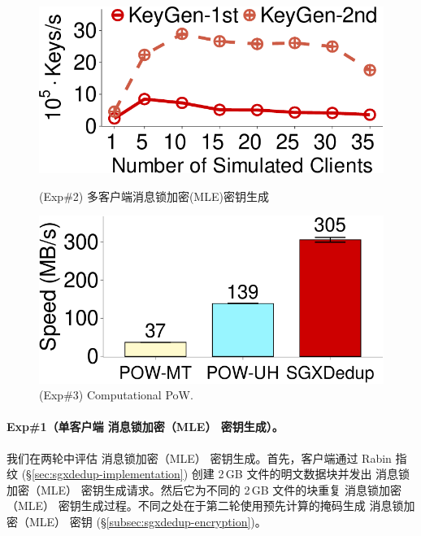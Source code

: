 \begin{figure}[!htb]
  \begin{minipage}[t]{0.47\textwidth}
  \centering
  \includegraphics[width=\linewidth]{pic/sgxdedup/expa3_keyScale_performance_number_multiThread.pdf}
  \caption{(Exp\#2) 多客户端消息锁加密(MLE)密钥生成}
  \label{fig:sgxdedup-exp-keygen-scalability}
  \end{minipage}%
  \hspace{0.2in}
  \begin{minipage}[t]{0.47\textwidth}
  \centering
  \includegraphics[width=\linewidth]{pic/sgxdedup/expa4_powPerformance.pdf}
  \caption{\small(Exp\#3) Computational PoW.}
  \label{fig:sgxdedup-pow-comparison}
  \end{minipage}%
\end{figure}


\paragraph*{Exp\#1（单客户端 消息锁加密（MLE） 密钥生成）。} 我们在两轮中评估 消息锁加密（MLE） 密钥生成。首先，客户端通过 Rabin 指纹 (\S\ref{sec:sgxdedup-implementation}) 创建 2\,GB 文件的明文数据块并发出 消息锁加密（MLE） 密钥生成请求。然后它为不同的 2\,GB 文件的块重复 消息锁加密（MLE） 密钥生成过程。不同之处在于第二轮使用预先计算的掩码生成 消息锁加密（MLE） 密钥 (\S\ref{subsec:sgxdedup-encryption})。

